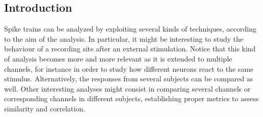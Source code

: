 \subsection{Introduction}
Spike trains can be analyzed by exploiting several kinds of techniques, according
to the aim of the analysis. In particular, it might be interesting to study the
behaviour of a recording site after an external stimulation. Notice that this kind
of analysis becomes more and more relevant as it is extended to multiple channels, for
instance in order to study how different neurons react to the same stimulus.
Alternatively, the responses from several subjects can be compared as well. Other
interesting analyses might consist in comparing several channels or corresponding
channels in different subjects, establishing proper metrics to assess similarity
and correlation.

